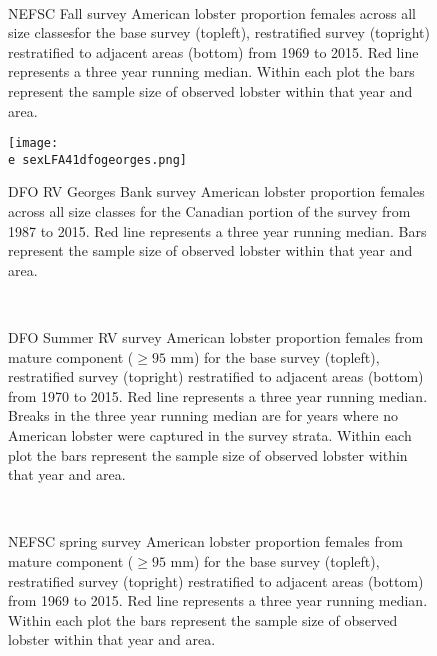 \documentclass[11pt]{article}
\newcommand{\e}{/backup/bio_data/bio.lobster/figures/} %
\begin{document}
\begin{figure}
\centering
{}
\\
\caption{NEFSC Fall survey American lobster proportion females across all size classesfor the base survey (topleft), restratified survey (topright) restratified to adjacent areas (bottom) from 1969 to 2015. Red line represents a three year running median. Within each plot the bars represent the sample size of observed lobster within that year and area. }
\end{figure}
\clearpage


\begin{figure}

    \texttt{[image: \\e sexLFA41dfogeorges.png]}
    \caption{DFO RV Georges Bank survey American lobster proportion females across all size classes for the Canadian portion of the survey from 1987 to 2015. Red line represents a three year running median. Bars represent the sample size of observed lobster within that year and area.}

\end{figure}


\begin{figure}
\centering
{}
\\
\caption{DFO Summer RV survey American lobster proportion females from mature component ($ \ge 95$ mm) for the base survey (topleft), restratified survey (topright) restratified to adjacent areas (bottom) from 1970 to 2015. Red line represents a three year running median. Breaks in the three year running median are for years where no American lobster were captured in the survey strata. Within each plot the bars represent the sample size of observed lobster within that year and area.}
\end{figure}
\clearpage


\begin{figure}
\centering
{}
\\
\caption{NEFSC spring survey American lobster proportion females from mature component ($ \ge 95$ mm) for the base survey (topleft), restratified survey (topright) restratified to adjacent areas (bottom) from 1969 to 2015. Red line represents a three year running median. Within each plot the bars represent the sample size of observed lobster within that year and area. }
\end{figure}
\clearpage
\end{document}

